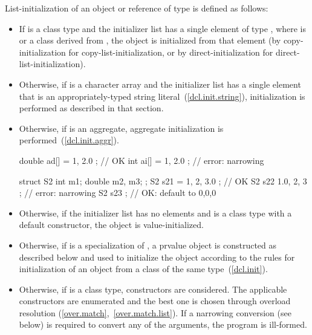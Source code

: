 \pnum
List-initialization of an object or reference of type  is defined as follows:
\begin{itemize}

\item If  is a class type and the initializer list has a single element
of type  ,
where  is  or a class derived from ,
the object is initialized from that element (by copy-initialization for
copy-list-initialization, or by direct-initialization for
direct-list-initialization).

\item Otherwise, if  is a character array and the initializer list has a
single element that is an appropriately-typed string literal~(\ref{dcl.init.string}),
initialization is performed as described in that section.

\item Otherwise, if  is an aggregate, aggregate initialization is
performed~(\ref{dcl.init.aggr}).

\enterexample
\begin{codeblock}
double ad[] = { 1, 2.0 };           // OK
int ai[] = { 1, 2.0 };              // error: narrowing

struct S2 {
  int m1;
  double m2, m3;
};
S2 s21 = { 1, 2, 3.0 };             // OK
S2 s22 { 1.0, 2, 3 };               // error: narrowing
S2 s23 { };                         // OK: default to 0,0,0
\end{codeblock}
\exitexample

\item Otherwise, if the initializer list has no elements and  is a class type with a
default constructor, the object is value-initialized.

\item Otherwise, if  is a specialization of ,
a prvalue  object is constructed as described below and used to
initialize the object according to the rules for initialization of an object from a
class of the same type~(\ref{dcl.init}).

\item Otherwise, if  is a class type, constructors are considered.
The applicable constructors are enumerated and
the best one is chosen through overload resolution (\ref{over.match},~\ref{over.match.list}). If a narrowing
conversion (see below) is required to convert any of the arguments, the program is
ill-formed.


\end{itemize}

